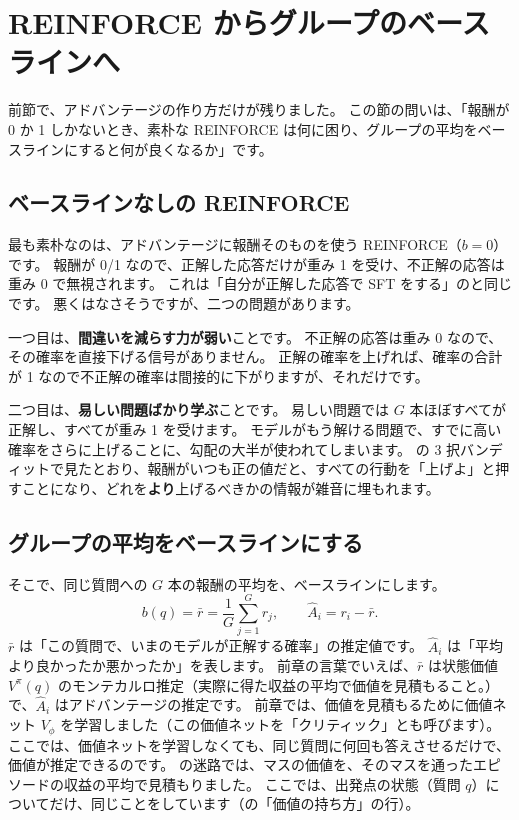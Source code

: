 \section{REINFORCE からグループのベースラインへ}\label{sec:rl-baseline}

前節で、アドバンテージの作り方だけが残りました。
この節の問いは、「報酬が 0 か 1 しかないとき、素朴な REINFORCE は何に困り、グループの平均をベースラインにすると何が良くなるか」です。

\subsection{ベースラインなしの REINFORCE}

最も素朴なのは、アドバンテージに報酬そのものを使う REINFORCE（$b=0$）です。
報酬が 0/1 なので、正解した応答だけが重み 1 を受け、不正解の応答は重み 0 で無視されます。
これは「自分が正解した応答で SFT をする」のと同じです。
悪くはなさそうですが、二つの問題があります。

一つ目は、\textbf{間違いを減らす力が弱い}ことです。
不正解の応答は重み 0 なので、その確率を直接下げる信号がありません。
正解の確率を上げれば、確率の合計が 1 なので不正解の確率は間接的に下がりますが、それだけです。

二つ目は、\textbf{易しい問題ばかり学ぶ}ことです。
易しい問題では $G$ 本ほぼすべてが正解し、すべてが重み 1 を受けます。
モデルがもう解ける問題で、すでに高い確率をさらに上げることに、勾配の大半が使われてしまいます。
の 3 択バンディットで見たとおり、報酬がいつも正の値だと、すべての行動を「上げよ」と押すことになり、どれを\textbf{より}上げるべきかの情報が雑音に埋もれます。

\subsection{グループの平均をベースラインにする}

そこで、同じ質問への $G$ 本の報酬の平均を、ベースラインにします。
\begin{equation}
b(q)=\bar r=\frac{1}{G}\sum_{j=1}^{G}r_j,
\qquad
\hat A_i=r_i-\bar r.
\label{eq:rl-group-baseline}
\end{equation}
$\bar r$ は「この質問で、いまのモデルが正解する確率」の推定値です。
$\hat A_i$ は「平均より良かったか悪かったか」を表します。
前章の言葉でいえば、$\bar r$ は状態価値 $V^\pi(q)$ のモンテカルロ推定（実際に得た収益の平均で価値を見積もること。）で、$\hat A_i$ はアドバンテージの推定です。
前章では、価値を見積もるために価値ネット $V_\phi$ を学習しました（この価値ネットを「クリティック」とも呼びます）。
ここでは、価値ネットを学習しなくても、同じ質問に何回も答えさせるだけで、価値が推定できるのです。
の迷路では、マスの価値を、そのマスを通ったエピソードの収益の平均で見積もりました。
ここでは、出発点の状態（質問 $q$）についてだけ、同じことをしています（の「価値の持ち方」の行）。

